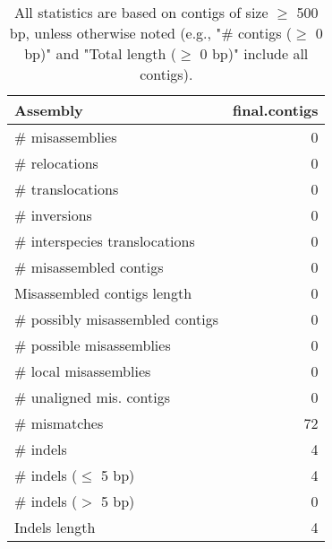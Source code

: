 \documentclass[12pt,a4paper]{article}
\begin{document}
\begin{table}[ht]
\begin{center}
\caption{All statistics are based on contigs of size $\geq$ 500 bp, unless otherwise noted (e.g., "\# contigs ($\geq$ 0 bp)" and "Total length ($\geq$ 0 bp)" include all contigs).}
\begin{tabular}{|l*{1}{|r}|}
\hline
Assembly & final.contigs \\ \hline
\# misassemblies & 0 \\ \hline
\hspace{5mm}\# relocations & 0 \\ \hline
\hspace{5mm}\# translocations & 0 \\ \hline
\hspace{5mm}\# inversions & 0 \\ \hline
\hspace{5mm}\# interspecies translocations & 0 \\ \hline
\# misassembled contigs & 0 \\ \hline
Misassembled contigs length & 0 \\ \hline
\# possibly misassembled contigs & 0 \\ \hline
\hspace{5mm}\# possible misassemblies & 0 \\ \hline
\# local misassemblies & 0 \\ \hline
\# unaligned mis. contigs & 0 \\ \hline
\# mismatches & 72 \\ \hline
\# indels & 4 \\ \hline
\hspace{5mm}\# indels ($\leq$ 5 bp) & 4 \\ \hline
\hspace{5mm}\# indels ($>$ 5 bp) & 0 \\ \hline
Indels length & 4 \\ \hline
\end{tabular}
\end{center}
\end{table}
\end{document}
